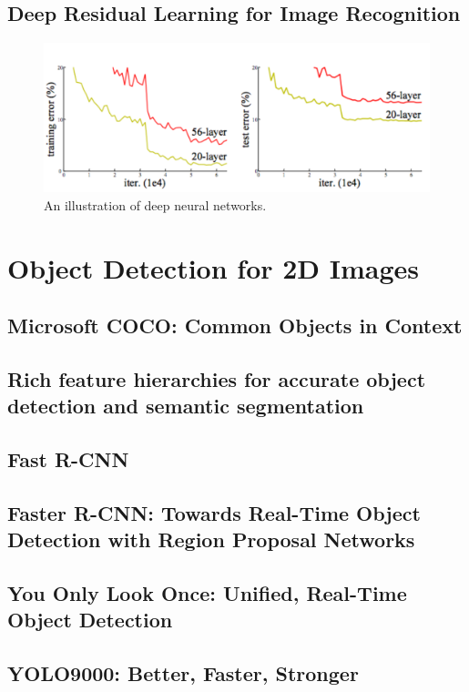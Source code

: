 \documentclass[a4paper,12pt]{article}
\begin{document}
\subsection{Deep Residual Learning for Image Recognition\cite{DBLP:journals/corr/HeZRS15}}

\begin{figure}[H]
  \begin{center}
      \includegraphics[scale=0.5]{renet1.png}
\end{center}
\caption{An illustration of deep neural networks.}
 \label {fig:4}
 \end{figure}

 
\section{Object Detection for 2D Images}

\subsection{Microsoft COCO: Common Objects in Context \cite{DBLP:journals/corr/LinMBHPRDZ14} }
\subsection{Rich feature hierarchies for accurate object detection and semantic
               segmentation\cite{DBLP:journals/corr/GirshickDDM13}}
\subsection{Fast R-CNN\cite{DBLP:conf/iccv/Girshick15}}
\subsection{Faster R-CNN: Towards Real-Time Object Detection with Region Proposal
               Networks\cite{DBLP:conf/nips/RenHGS15}}
\subsection{You Only Look Once: Unified, Real-Time Object Detection\cite{DBLP:journals/corr/RedmonDGF15}}
\subsection{YOLO9000: Better, Faster, Stronger\cite{DBLP:journals/corr/RedmonF16}}

               


  
 
\end{document}
